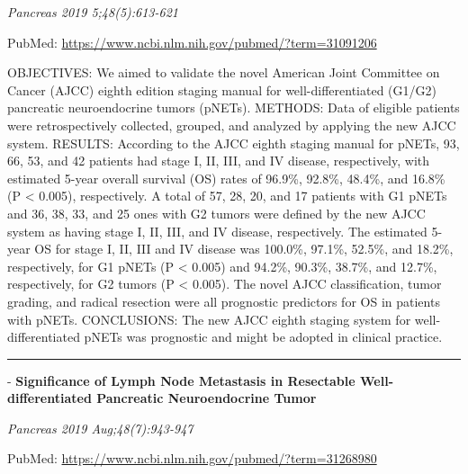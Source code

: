 \documentclass[]{article}
\begin{document}
\emph{Pancreas 2019 5;48(5):613-621}

PubMed: \url{https://www.ncbi.nlm.nih.gov/pubmed/?term=31091206}

OBJECTIVES: We aimed to validate the novel American Joint Committee on
Cancer (AJCC) eighth edition staging manual for well-differentiated
(G1/G2) pancreatic neuroendocrine tumors (pNETs). METHODS: Data of
eligible patients were retrospectively collected, grouped, and analyzed
by applying the new AJCC system. RESULTS: According to the AJCC eighth
staging manual for pNETs, 93, 66, 53, and 42 patients had stage I, II,
III, and IV disease, respectively, with estimated 5-year overall
survival (OS) rates of 96.9\%, 92.8\%, 48.4\%, and 16.8\% (P \textless{}
0.005), respectively. A total of 57, 28, 20, and 17 patients with G1
pNETs and 36, 38, 33, and 25 ones with G2 tumors were defined by the new
AJCC system as having stage I, II, III, and IV disease, respectively.
The estimated 5-year OS for stage I, II, III and IV disease was 100.0\%,
97.1\%, 52.5\%, and 18.2\%, respectively, for G1 pNETs (P \textless{}
0.005) and 94.2\%, 90.3\%, 38.7\%, and 12.7\%, respectively, for G2
tumors (P \textless{} 0.005). The novel AJCC classification, tumor
grading, and radical resection were all prognostic predictors for OS in
patients with pNETs. CONCLUSIONS: The new AJCC eighth staging system for
well-differentiated pNETs was prognostic and might be adopted in
clinical practice.

{}

{}

\begin{center}\rule{0.5\linewidth}{\linethickness}\end{center}

 - \textbf{Significance of Lymph Node Metastasis in Resectable
Well-differentiated Pancreatic Neuroendocrine Tumor}

\emph{Pancreas 2019 Aug;48(7):943-947}

PubMed: \url{https://www.ncbi.nlm.nih.gov/pubmed/?term=31268980}
\end{document}
